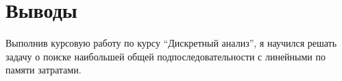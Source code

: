 \section{Выводы}
Выполнив курсовую работу по курсу \enquote{Дискретный анализ}, я научился решать задачу о поиске наибольшей общей подпоследовательности с линейными по памяти затратами.
\pagebreak
